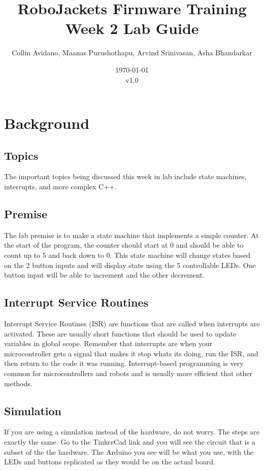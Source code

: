 \documentclass{article}
\title{RoboJackets Firmware Training Week 2 Lab Guide}
\author{Collin Avidano, Maanas Purushothapu, Arvind Srinivasan, Asha Bhandarkar}
\date{\today\\v1.0}
\begin{document}
\maketitle{}
\setcounter{tocdepth}{2}
\tableofcontents
\pagebreak


\section{Background}
    \subsection{Topics}
        The important topics being discussed this week in lab include state machines, interrupts, and more complex C++.
    \subsection{Premise}
        The lab premise is to make a state machine that implements a simple counter. At the start of the program, the counter should start at 0 and should be able to count up to 5 and back down to 0. This state machine will change states based on the 2 button inputs and will display state using the 5 controllable LEDs. One button input will be able to increment and the other decrement.
    \subsection{Interrupt Service Routines}
        Interrupt Service Routines (ISR) are functions that are called when interrupts are activated. These are usually short functions that should be used to update variables in global scope. Remember that interrupts are when your microcontroller gets a signal that makes it stop whats its doing, run the ISR, and then return to the code it was running. Interrupt-based programming is very common for microcontrollers and robots and is usually more efficient that other methods.
        
    \subsection{Simulation}
        If you are using a simulation instead of the hardware, do not worry.  The steps are exactly the same.  Go to the TinkerCad link and you will see the circuit that is a subset of the the hardware. The Arduino you see will be what you use, with the LEDs and buttons replicated as they would be on the actual board. 
        
\end{document}
